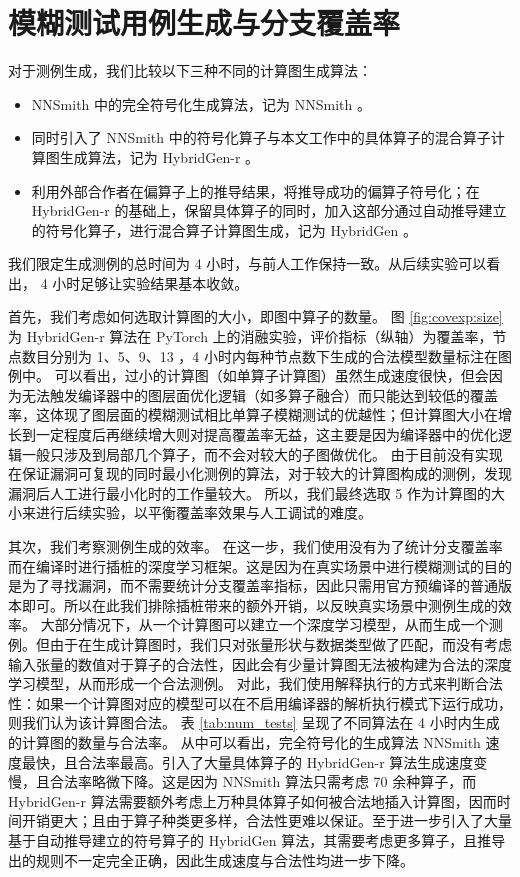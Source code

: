 \section{模糊测试用例生成与分支覆盖率}
\label{sec:exp_gen}

对于测例生成，我们比较以下三种不同的计算图生成算法：
\begin{itemize}
    \item NNSmith 中的完全符号化生成算法，记为 NNSmith 。
    \item 同时引入了 NNSmith 中的符号化算子与本文工作中的具体算子的混合算子计算图生成算法，记为 HybridGen-r 。
    \item 利用外部合作者在偏算子上的推导结果，将推导成功的偏算子符号化；在 HybridGen-r 的基础上，保留具体算子的同时，加入这部分通过自动推导建立的符号化算子，进行混合算子计算图生成，记为 HybridGen 。
\end{itemize}
我们限定生成测例的总时间为 4 小时，与前人工作\cite{nnsmith,tzer}保持一致。从后续实验可以看出， 4 小时足够让实验结果基本收敛。

首先，我们考虑如何选取计算图的大小，即图中算子的数量。
图 \ref{fig:covexp:size} 为 HybridGen-r 算法在 PyTorch 上的消融实验，评价指标（纵轴）为覆盖率，节点数目分别为 1、5、9、13 ，4 小时内每种节点数下生成的合法模型数量标注在图例中。
可以看出，过小的计算图（如单算子计算图）虽然生成速度很快，但会因为无法触发编译器中的图层面优化逻辑（如多算子融合）而只能达到较低的覆盖率，这体现了图层面的模糊测试相比单算子模糊测试的优越性；但计算图大小在增长到一定程度后再继续增大则对提高覆盖率无益，这主要是因为编译器中的优化逻辑一般只涉及到局部几个算子，而不会对较大的子图做优化。
由于目前没有实现在保证漏洞可复现的同时最小化测例的算法，对于较大的计算图构成的测例，发现漏洞后人工进行最小化时的工作量较大。
所以，我们最终选取 5 作为计算图的大小来进行后续实验，以平衡覆盖率效果与人工调试的难度。

其次，我们考察测例生成的效率。
在这一步，我们使用没有为了统计分支覆盖率而在编译时进行插桩的深度学习框架。这是因为在真实场景中进行模糊测试的目的是为了寻找漏洞，而不需要统计分支覆盖率指标，因此只需用官方预编译的普通版本即可。所以在此我们排除插桩带来的额外开销，以反映真实场景中测例生成的效率。
大部分情况下，从一个计算图可以建立一个深度学习模型，从而生成一个测例。但由于在生成计算图时，我们只对张量形状与数据类型做了匹配，而没有考虑输入张量的数值对于算子的合法性，因此会有少量计算图无法被构建为合法的深度学习模型，从而形成一个合法测例。
对此，我们使用解释执行的方式来判断合法性：如果一个计算图对应的模型可以在不启用编译器的解析执行模式下运行成功，则我们认为该计算图合法。
表 \ref{tab:num_tests} 呈现了不同算法在 4 小时内生成的计算图的数量与合法率。
从中可以看出，完全符号化的生成算法 NNSmith 速度最快，且合法率最高。引入了大量具体算子的 HybridGen-r 算法生成速度变慢，且合法率略微下降。这是因为 NNSmith 算法只需考虑 70 余种算子，而 HybridGen-r 算法需要额外考虑上万种具体算子如何被合法地插入计算图，因而时间开销更大；且由于算子种类更多样，合法性更难以保证。至于进一步引入了大量基于自动推导建立的符号算子的 HybridGen 算法，其需要考虑更多算子，且推导出的规则不一定完全正确，因此生成速度与合法性均进一步下降。

